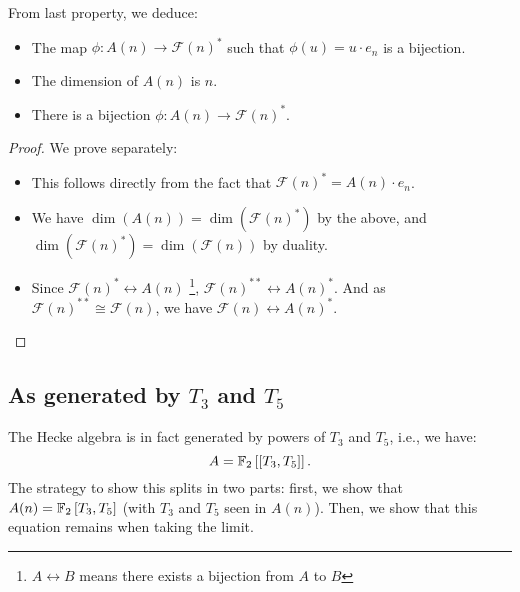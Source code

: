 \begin{corollary}
	From last property, we deduce:
	\begin{itemize}
		\item The map $\phi: A(n) \to \mathcal{F}(n)^*$ such that $\phi(u) = u \cdot e_n$ is a bijection.
		\item The dimension of $A(n)$ is $n$.
		\item There is a bijection $\phi: A(n) \to \mathcal{F}(n)^*$.
	\end{itemize}
\end{corollary}
\begin{proof}
	We prove separately:
	\begin{itemize}
		\item This follows directly from the fact that $\mathcal{F}(n)^* = A(n) \cdot e_n$.
		\item We have $\dim(A(n)) = \dim(\mathcal{F}(n)^*)$ by the above, and $\dim(\mathcal{F}(n)^*) = \dim(\mathcal{F}(n))$ by duality.
		\item Since $\mathcal{F}(n)^* \leftrightarrow A(n)$
		\footnote{$A \leftrightarrow B$ means there exists a bijection from $A$ to $B$}, $\mathcal{F}(n)^{**} \leftrightarrow A(n)^*$.
		And as $\mathcal{F}(n)^{**} \cong \mathcal{F}(n)$, we have $\mathcal{F}(n) \leftrightarrow A(n)^*$.
	\end{itemize}
\end{proof}



\subsection{As generated by $T_3$ and $T_5$}
The Hecke algebra is in fact generated by powers of $T_3$ and $T_5$, i.e., we have:
$$
A = \mathbb{F}_2 \left[\left[ T_3, T_5 \right]\right] .
$$
The strategy to show this splits in two parts:
first, we show that $A(n) = \mathbb{F}_2 \left[ T_3, T_5 \right]$ (with $T_3$ and $T_5$ seen in $A(n)$).
Then, we show that this equation remains when taking the limit.

